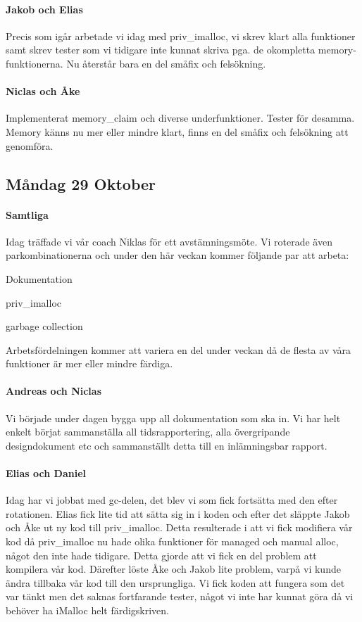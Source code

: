 \documentclass{article}
\begin{document}
\paragraph*{Jakob och Elias} Precis som igår arbetade vi idag med priv\_imalloc, vi skrev klart alla funktioner samt skrev tester som vi tidigare inte kunnat skriva pga. de okompletta memory-funktionerna. Nu återstår bara en del småfix och felsökning.

\paragraph*{Niclas och Åke} Implementerat memory\_claim och diverse underfunktioner. Tester för desamma. Memory känns nu mer eller mindre klart, finns en del småfix och felsökning att genomföra.

\subsection{Måndag 29 Oktober}
\paragraph*{Samtliga} Idag träffade vi vår coach Niklas för ett avstämningsmöte. Vi roterade även parkombinationerna och under den här veckan kommer följande par att arbeta:

\begin{description} \parskip0pt
  \item[Andreas och Niclas] Dokumentation
  \item[Jakob och Åke] priv\_imalloc
  \item[Daniel och Elias] garbage collection
\end{description}

Arbetsfördelningen kommer att variera en del under veckan då de flesta av våra funktioner är mer eller mindre färdiga.

\paragraph*{Andreas och Niclas} Vi började under dagen bygga upp all dokumentation som ska in. Vi har helt enkelt börjat sammanställa all tidsrapportering, alla övergripande designdokument etc och sammanställt detta till en inlämningsbar rapport.

\paragraph*{Elias och Daniel} Idag har vi jobbat med gc-delen, det blev vi som fick fortsätta med den efter rotationen. Elias fick lite tid att sätta sig in i koden och efter det släppte Jakob och Åke ut ny kod till priv\_imalloc. Detta resulterade i att vi fick modifiera vår kod då priv\_imalloc nu hade olika funktioner för managed och manual alloc, något den inte hade tidigare. Detta gjorde att vi fick en del problem att kompilera vår kod. Därefter löste Åke och Jakob lite problem, varpå vi kunde ändra tillbaka vår kod till den ursprungliga. Vi fick koden att fungera som det var tänkt men det saknas fortfarande tester, något vi inte har kunnat göra då vi behöver ha iMalloc helt färdigskriven.
\end{document}
